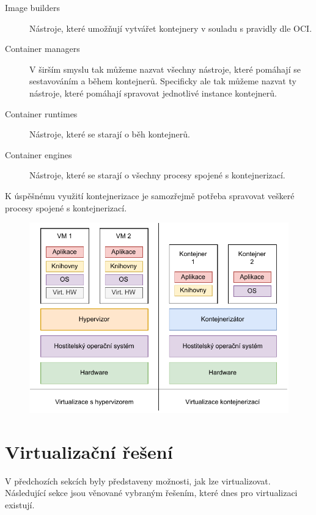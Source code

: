 \begin{description}
    \item[Image builders] Nástroje, které umožňují vytvářet kontejnery v souladu s pravidly dle OCI.
    \item[Container managers] V širším smyslu tak můžeme nazvat všechny nástroje, které pomáhají se sestavováním a během kontejnerů. Specificky ale tak můžeme nazvat ty nástroje, které pomáhají spravovat jednotlivé instance kontejnerů.
    \item[Container runtimes] Nástroje, které se starají o běh kontejnerů.
    \item[Container engines] Nástroje, které se starají o všechny procesy spojené s  kontejnerizací.
\end{description}

K úspěšnému využití kontejnerizace je samozřejmě potřeba spravovat veškeré procesy spojené s kontejnerizací. 

\begin{figure}[htbp]
    \centering 
    \includegraphics[width=\textwidth]{assets/img/containerization.pdf}
    \label{fig:containerization}
\end{figure}


\section{Virtualizační řešení}

V předchozích sekcích byly představeny možnosti, jak lze virtualizovat. Následující sekce jsou věnované vybraným řešením, které dnes pro virtualizaci existují.

